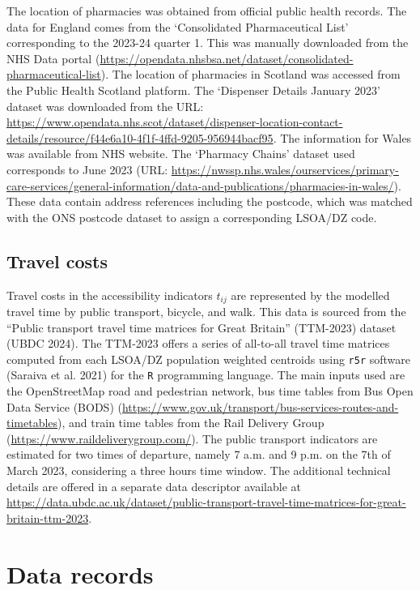 \documentclass{article}
\begin{document}
The location of pharmacies was obtained from official public health
records. The data for England comes from the `Consolidated
Pharmaceutical List' corresponding to the 2023-24 quarter 1. This was
manually downloaded from the NHS Data portal
(\url{https://opendata.nhsbsa.net/dataset/consolidated-pharmaceutical-list}).
The location of pharmacies in Scotland was accessed from the Public
Health Scotland platform. The `Dispenser Details January 2023' dataset
was downloaded from the URL:
\url{https://www.opendata.nhs.scot/dataset/dispenser-location-contact-details/resource/f44e6a10-4f1f-4ffd-9205-956944bacf95}.
The information for Wales was available from NHS website. The `Pharmacy
Chains' dataset used corresponds to June 2023 (URL:
\url{https://nwssp.nhs.wales/ourservices/primary-care-services/general-information/data-and-publications/pharmacies-in-wales/}).
These data contain address references including the postcode, which was
matched with the ONS postcode dataset to assign a corresponding LSOA/DZ
code.

\hypertarget{travel-costs}{%
\subsection{Travel costs}\label{travel-costs}}

Travel costs in the accessibility indicators \(t_{ij}\) are represented
by the modelled travel time by public transport, bicycle, and walk. This
data is sourced from the ``Public transport travel time matrices for
Great Britain'' (TTM-2023) dataset (UBDC 2024). The TTM-2023 offers a
series of all-to-all travel time matrices computed from each LSOA/DZ
population weighted centroids using \texttt{r5r} software (Saraiva et
al. 2021) for the \texttt{R} programming language. The main inputs used
are the OpenStreetMap road and pedestrian network, bus time tables from
Bus Open Data Service (BODS)
(\url{https://www.gov.uk/transport/bus-services-routes-and-timetables}),
and train time tables from the Rail Delivery Group
(\url{https://www.raildeliverygroup.com/}). The public transport
indicators are estimated for two times of departure, namely 7 a.m. and 9
p.m. on the 7th of March 2023, considering a three hours time window.
The additional technical details are offered in a separate data
descriptor available at
\url{https://data.ubdc.ac.uk/dataset/public-transport-travel-time-matrices-for-great-britain-ttm-2023}.

\hypertarget{data-records}{%
\section{Data records}\label{data-records}}
\end{document}
